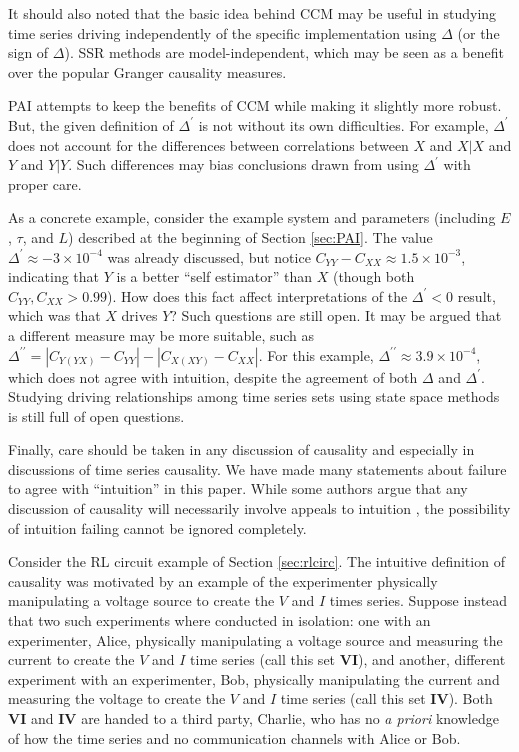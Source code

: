 \documentclass[a4paper,11pt,twocolumn]{article}
\begin{document}
It should also noted that the basic idea behind CCM may be useful in studying time series driving independently of the specific implementation using $\Delta$ (or the sign of $\Delta$). SSR methods are model-independent, which may be seen as a benefit over the popular Granger causality measures.  

PAI attempts to keep the benefits of CCM while making it slightly more robust.  But, the given definition of $\Delta^\prime$ is not without its own difficulties.  For example, $\Delta^\prime$ does not account for the differences between correlations between $X$ and $X|X$ and $Y$ and $Y|Y$.  Such differences may bias conclusions drawn from using $\Delta^\prime$ with proper care.  

As a concrete example, consider the example system and parameters (including $E$, $\tau$, and $L$) described at the beginning of Section \ref{sec:PAI}.  The value $\Delta^\prime \approx -3\times 10^{-4}$ was already discussed, but notice $C_{YY}-C_{XX} \approx 1.5\times10^{-3}$, indicating that $Y$ is a better ``self estimator'' than $X$ (though both $C_{YY},C_{XX}>0.99$).  How does this fact affect interpretations of the $\Delta^\prime<0$ result, which was that $X$ drives $Y$?  Such questions are still open.  It may be argued that a different measure may be more suitable, such as $\Delta^{\prime\prime} = |C_{Y(YX)}-C_{YY}|-|C_{X(XY)}-C_{XX}|$.  For this example, $\Delta^{\prime\prime} \approx 3.9\times 10^{-4}$, which does not agree with intuition, despite the agreement of both $\Delta$ and $\Delta^\prime$.  Studying driving relationships among time series sets using state space methods is still full of open questions.

Finally, care should be taken in any discussion of causality and especially in discussions of time series causality.  We have made many statements about failure to agree with ``intuition'' in this paper.  While some authors argue that any discussion of causality will necessarily involve appeals to intuition \cite{Pearl2000}, the possibility of intuition failing cannot be ignored completely.  

Consider the RL circuit example of Section \ref{sec:rlcirc}.  The intuitive definition of causality was motivated by an example of the experimenter physically manipulating a voltage source to create the $V$ and $I$ times series.  Suppose instead that two such experiments where conducted in isolation: one with an experimenter, Alice, physically manipulating a voltage source and measuring the current to create the $V$ and $I$ time series (call this set $\mathbf{VI}$), and another, different experiment with an experimenter, Bob, physically manipulating the current and measuring the voltage to create the $V$ and $I$ time series (call this set $\mathbf{IV}$).  Both $\mathbf{VI}$ and $\mathbf{IV}$ are handed to a third party, Charlie, who has no {\em a priori} knowledge of how the time series and no communication channels with Alice or Bob.
\end{document}
